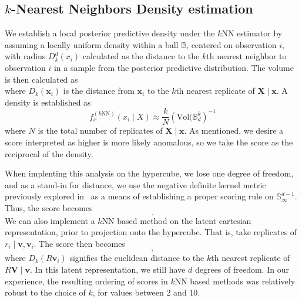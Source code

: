 \subsection{$k$-Nearest Neighbors Density estimation}
We establish a local posterior predictive density under the $k$NN estimator by 
  assuming a locally uniform density within a ball $\mathbb{B}$, centered on 
  observation $i$, with radius $D_{k}^d(x_i)$ calculated as the distance to the 
  $k$th nearest neighbor to observation $i$ in a sample from the posterior 
  predictive distribution. The volume is then calculated as
  \begin{equation*}
    
  \end{equation*}
  where $D_k(\bm{x}_i)$ is the distance from $\bm{x}_i$ to the $k$th nearest 
  replicate of $\bm{X}\mid\bm{x}$.  A density is established as
  \begin{equation*}
    f_{x}^{(k\text{NN})}(x_i\mid X) \approx 
          \frac{k}{N}\left(\text{Vol}(\mathbb{B}_d^k\right)^{-1}
  \end{equation*}
  where $N$ is the total number of replicates of $\bm{X}\mid\bm{x}$.  As mentioned,
  we desire a score interpreted as higher is more likely anomalous, so we take
  the score as the reciprocal of the density.

When implenting this analysis on the hypercube, we lose one degree of freedom,
  and as a stand-in for distance, we use the negative definite kernel metric 
  previously explored in~\cite{trubey:pg} as a means of establishing a proper 
  scoring rule on $\mathbb{S}_{\infty}^{d-1}$.  Thus, the score becomes
  \begin{equation}
    \label{eq:ad_knn_h}
    .
  \end{equation}
  We can also implement a $k$NN based method on the latent cartesian
  representation, prior to projection onto the hypercube.  That is, take replicates
  of $r_i\mid \bm{v},\bm{v}_i$.  The score then becomes
  \begin{equation}
    \label{eq:ad_knn_e}
    ,
  \end{equation}
  where $D_k(R\bm{v}_i)$ signifies the euclidean distance to the $k$th nearest
  replicate of $R\bm{V}\mid\bm{v}$.  In this latent representation, we still have
  $d$ degrees of freedom. In our experience, the resulting ordering of
  scores in $k$NN based methods was relatively robust to the choice of $k$, for 
  values between 2 and 10.

